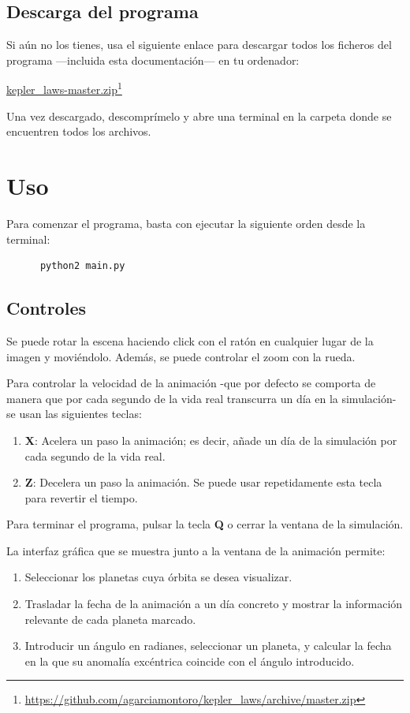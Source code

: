 \documentclass[a4paper, 11pt]{article}
\newcommand\fnurl[2]{%
  \href{#2}{#1}\footnote{\url{#2}}%
}
\begin{document}
  \subsection{Descarga del programa}
  Si aún no los tienes, usa el siguiente enlace para descargar todos los ficheros del programa ---incluida esta documentación--- en tu ordenador:

  \fnurl{kepler\_laws-master.zip}{https://github.com/agarciamontoro/kepler\_laws/archive/master.zip}

  Una vez descargado, descomprímelo y abre una terminal en la carpeta donde se encuentren todos los archivos.

  \section{Uso}

  Para comenzar el programa, basta con ejecutar la siguiente orden desde la terminal:

  \begin{lstlisting}
      python2 main.py
  \end{lstlisting}

  \subsection{Controles}

  Se puede rotar la escena haciendo click con el ratón en cualquier lugar de la imagen y moviéndolo. Además, se puede controlar el zoom con la rueda.

  Para controlar la velocidad de la animación -que por defecto se comporta de manera que por cada segundo de la vida real transcurra un día en la simulación- se usan las siguientes teclas:

  \begin{enumerate}
      \item \textbf{X}: Acelera un paso la animación; es decir, añade un día de la simulación por cada segundo de la vida real.
      \item \textbf{Z}: Decelera un paso la animación. Se puede usar repetidamente esta tecla para revertir el tiempo.
  \end{enumerate}

  Para terminar el programa, pulsar la tecla \textbf{Q} o cerrar la ventana de la simulación.

  La interfaz gráfica que se muestra junto a la ventana de la animación permite:

  \begin{enumerate}
      \item Seleccionar los planetas cuya órbita se desea visualizar.
      \item Trasladar la fecha de la animación a un día concreto y mostrar la información relevante de cada planeta marcado.
      \item Introducir un ángulo en radianes, seleccionar un planeta, y calcular la fecha en la que su anomalía excéntrica coincide con el ángulo introducido.
  \end{enumerate}
\end{document}
